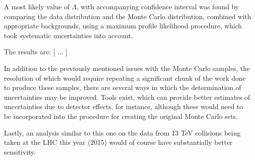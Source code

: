 \begin{english}
A most likely value of $\Lambda$, with accompanying confidence interval was found by comparing the data distribution and the Monte Carlo distribution, combined with appropriate backgrounds, using a maximum profile likelihood procedure, which took systematic uncertainties into account.

The results are: [ ... ]

In addition to the previously mentioned issues with the Monte Carlo samples, the resolution of which would require repeating a significant chunk of the work done to produce these samples, there are several ways in which the determination of uncertainties may be improved. Tools exist, which can provide better estimates of uncertainties due to detector effects, for instance, although these would need to be incorporated into the procedure for creating the original Monte Carlo sets.

Lastly, an analysis similar to this one on the data from 13 TeV collisions being taken at the LHC this year (2015) would of course have substantially better sensitivity.

\printbibliography[title=References]



\end{english}

